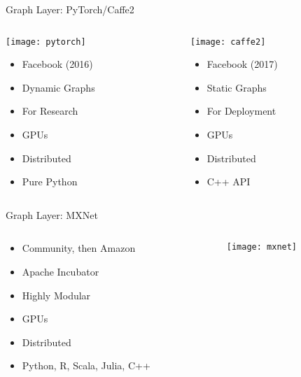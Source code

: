 \begin{slide}{Graph Layer: PyTorch/Caffe2}
  \begin{columns}
    \hspace{0.2cm}
    \begin{column}{0.4\textwidth}
      \centering
      \hspace{-1.2cm}\texttt{[image: pytorch]}
      \vspace{0.2cm}

      \begin{itemize}
        \item Facebook (2016)
        \item Dynamic Graphs
        \item For Research
        \item GPUs \cmark
        \item Distributed \cmark
        \item Pure Python
      \end{itemize}
    \end{column}
    \begin{column}{0.5\textwidth}
      \centering
      \hspace{-1.2cm}\texttt{[image: caffe2]}
      \vspace{0.4cm}

      \begin{itemize}
        \item Facebook (2017)
        \item Static Graphs
        \item For Deployment
        \item GPUs \cmark
        \item Distributed \cmark
        \item C++ API \cmark
      \end{itemize}
    \end{column}
  \end{columns}
\end{slide}

\begin{slide}{Graph Layer: MXNet}
  \begin{columns}
    \begin{column}{0.6\textwidth}
      \begin{itemize}
        \item Community, then Amazon
        \item Apache Incubator
        \item Highly Modular
        \item GPUs \cmark
        \item Distributed \cmark
        \item Python, R, Scala, Julia, C++ \cmark
      \end{itemize}
    \end{column}
    \begin{column}{0.4\textwidth}
      \texttt{[image: mxnet]}
    \end{column}
  \end{columns}
\end{slide}

